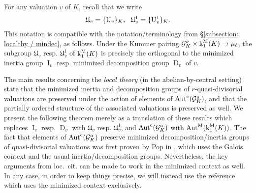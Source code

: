 \documentclass[11pt]{amsart}
\theoremstyle{definition}
\theoremstyle{remark}
\numberwithin{equation}{section}
\DeclareMathOperator{\Aut}{Aut}
\DeclareMathOperator{\D}{D}
\DeclareMathOperator{\I}{I}
\newcommand{\U}{{\rm U}}
\newcommand{\Gc}{\mathcal{G}}
\newcommand{\Ufrak}{\mathfrak{U}}
\newcommand{\Autm}{\Aut^{\rm M}}
\newcommand{\Autc}{\Aut^{\rm c}}
\renewcommand{\k}{\operatorname{k}^{\rm M}}
\begin{document}
For any valuation $v$ of $K$, recall that we write
\[ \Ufrak_v = \{\U_v\}_K, \ \ \Ufrak_v^1 = \{\U_v^1\}_K. \]
This notation is compatible with the notation/terminology from \S\ref{subsection: localthy / mindec}, as follows.
Under the Kummer pairing $\Gc_K^a \times \k_1(K) \rightarrow \mu_\ell$, the subgroup $\Ufrak_v$ resp. $\Ufrak_v^1$ of $\k_1(K)$ is precisely the orthogonal to the minimized inertia group $\I_v$ resp. minimized decomposition group $\D_v$ of $v$.

The main results concerning the \emph{local theory} (in the abelian-by-central setting) state that the minimized inertia and decomposition groups of $r$-quasi-divisorial valuations are preserved under the action of elements of $\Autc(\Gc_K^a)$, and that the partially ordered structure of the associated valuations is preserved as well.
We present the following theorem merely as a translation of these results which replaces $\I_v$ resp. $\D_v$ with $\Ufrak_v$ resp. $\Ufrak_v^1$, and $\Autc(\Gc_K^a)$ with $\Autm(\k_1(K))$.
The fact that elements of $\Autc(\Gc_K^a)$ preserve minimized decomposition/inertia groups of quasi-divisorial valuations was first proven by {\sc Pop} in \cite{Pop:2010a}, which uses the Galois context and the usual inertia/decomposition groups.
Nevertheless, the key arguments from loc.~cit. can be made to work in the minimized context as well.
In any case, in order to keep things precise, we will instead use the reference \cite{Topaz:2015} which uses the minimized context exclusively.
\end{document}
